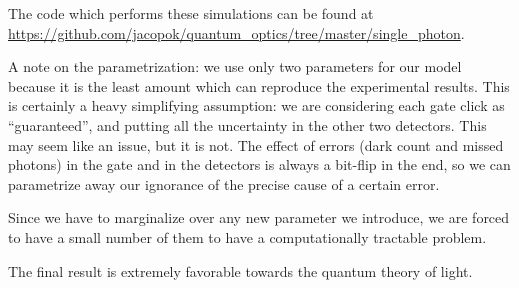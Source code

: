 \documentclass[main.tex]{subfiles}
\begin{document}
The code which performs these simulations can be found at \url{https://github.com/jacopok/quantum_optics/tree/master/single_photon}. 

A note on the parametrization: we use only two parameters for our model because it is the least amount which can reproduce the experimental results.
This is certainly a heavy simplifying assumption: we are considering each gate click as ``guaranteed'', and putting all the uncertainty in the other two detectors.
This may seem like an issue, but it is not. The effect of errors (dark count and missed photons) in the gate and in the detectors is always a bit-flip in the end, so we can parametrize away our ignorance of the precise cause of a certain error. 

Since we have to marginalize over any new parameter we introduce, we are forced to have a small number of them to have a computationally tractable problem. 

The final result is extremely favorable towards the quantum theory of light.
\end{document}
